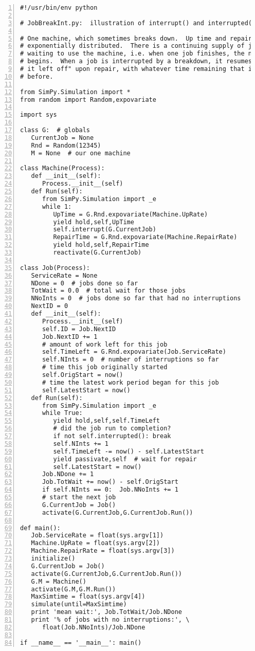 \documentclass[11pt]{article}
\begin{document}
\begin{Verbatim}[fontsize=\relsize{-2},numbers=left]
#!/usr/bin/env python

# JobBreakInt.py:  illustration of interrupt() and interrupted()

# One machine, which sometimes breaks down.  Up time and repair time are
# exponentially distributed.  There is a continuing supply of jobs
# waiting to use the machine, i.e. when one job finishes, the next
# begins.  When a job is interrupted by a breakdown, it resumes "where
# it left off" upon repair, with whatever time remaining that it had
# before.

from SimPy.Simulation import *
from random import Random,expovariate

import sys

class G:  # globals
   CurrentJob = None
   Rnd = Random(12345)
   M = None  # our one machine

class Machine(Process):
   def __init__(self):
      Process.__init__(self)  
   def Run(self):
      from SimPy.Simulation import _e
      while 1:
         UpTime = G.Rnd.expovariate(Machine.UpRate)
         yield hold,self,UpTime
         self.interrupt(G.CurrentJob)
         RepairTime = G.Rnd.expovariate(Machine.RepairRate)
         yield hold,self,RepairTime
         reactivate(G.CurrentJob)

class Job(Process):
   ServiceRate = None
   NDone = 0  # jobs done so far
   TotWait = 0.0  # total wait for those jobs
   NNoInts = 0  # jobs done so far that had no interruptions
   NextID = 0
   def __init__(self):
      Process.__init__(self)  
      self.ID = Job.NextID
      Job.NextID += 1
      # amount of work left for this job
      self.TimeLeft = G.Rnd.expovariate(Job.ServiceRate)  
      self.NInts = 0  # number of interruptions so far
      # time this job originally started
      self.OrigStart = now()
      # time the latest work period began for this job
      self.LatestStart = now()
   def Run(self):
      from SimPy.Simulation import _e
      while True:
         yield hold,self,self.TimeLeft
         # did the job run to completion?
         if not self.interrupted(): break
         self.NInts += 1
         self.TimeLeft -= now() - self.LatestStart
         yield passivate,self  # wait for repair
         self.LatestStart = now()
      Job.NDone += 1
      Job.TotWait += now() - self.OrigStart
      if self.NInts == 0:  Job.NNoInts += 1
      # start the next job
      G.CurrentJob = Job()
      activate(G.CurrentJob,G.CurrentJob.Run())

def main():
   Job.ServiceRate = float(sys.argv[1])
   Machine.UpRate = float(sys.argv[2])
   Machine.RepairRate = float(sys.argv[3])
   initialize()
   G.CurrentJob = Job()
   activate(G.CurrentJob,G.CurrentJob.Run())
   G.M = Machine()
   activate(G.M,G.M.Run())
   MaxSimtime = float(sys.argv[4])
   simulate(until=MaxSimtime)
   print 'mean wait:', Job.TotWait/Job.NDone
   print '% of jobs with no interruptions:', \
      float(Job.NNoInts)/Job.NDone

if __name__ == '__main__': main()
\end{Verbatim}
\end{document}
